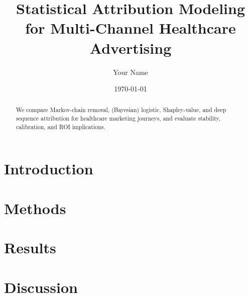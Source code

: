 \documentclass[10pt]{article}
\title{Statistical Attribution Modeling for Multi-Channel Healthcare Advertising}
\author{Your Name}
\date{\today}
\begin{document}
\maketitle
\begin{abstract}
We compare Markov-chain removal, (Bayesian) logistic, Shapley-value, and deep sequence attribution for healthcare marketing journeys, and evaluate stability, calibration, and ROI implications.
\end{abstract}
\section{Introduction}
\section{Methods}
\section{Results}
\section{Discussion}
\end{document}
